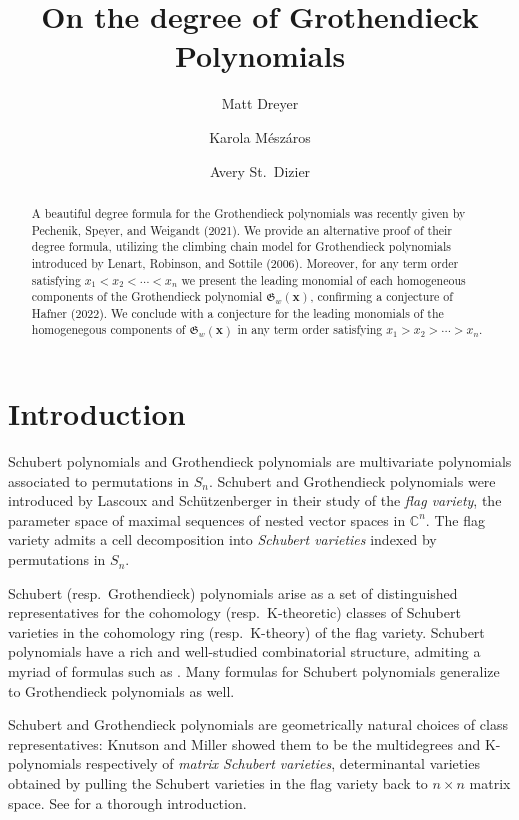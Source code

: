\documentclass[11pt]{amsart}
\title{On the degree of Grothendieck Polynomials}
\author{Matt Dreyer}
\author{Karola M\'esz\'aros}
\author{Avery St.~Dizier}
\theoremstyle{definition}
\theoremstyle{named}
\begin{document}
	\begin{abstract}
		A beautiful degree formula for the Grothendieck polynomials was recently given by Pechenik, Speyer, and Weigandt (2021). We provide an alternative proof of their degree formula, utilizing the climbing chain model for Grothendieck polynomials introduced by Lenart, Robinson, and Sottile (2006). Moreover, for any term order satisfying $x_1<x_2<\cdots<x_n$ we present the leading monomial of each homogeneous components of the Grothendieck polynomial $\mathfrak{G}_w(\bm{x})$, confirming a conjecture of Hafner (2022). We conclude with a conjecture for the leading monomials of the homogenegous components of $\mathfrak{G}_w(\bm{x})$ in any term order satisfying $x_1>x_2>\cdots>x_n$.
	\end{abstract}

	\maketitle
	
	\section{Introduction}
	Schubert polynomials and Grothendieck polynomials are multivariate polynomials associated to permutations in $S_n$. 
	Schubert and Grothendieck polynomials were introduced by Lascoux and Sch\"utzenberger \cite{LS1,LS2} in their study of the \emph{flag variety}, the parameter space of maximal sequences of nested vector spaces in $\mathbb{C}^n$. The flag variety admits a cell decomposition into \emph{Schubert varieties} indexed by permutations in $S_n$.
	
	Schubert (resp.\ Grothendieck) polynomials arise as a set of distinguished representatives for the cohomology (resp.\ K-theoretic) classes of Schubert varieties in the cohomology ring (resp.\ K-theory) of the flag variety. Schubert polynomials have a rich and well-studied combinatorial structure, admiting a myriad of formulas such as \cite{laddermoves, BJS, FKschub, nilcoxeter, thomas, lenart, prismtableaux,balancedtableaux}. Many formulas for Schubert polynomials generalize to Grothendieck polynomials as well. 
	
	Schubert and Grothendieck polynomials are geometrically natural choices of class representatives: Knutson and Miller \cite{grobner} showed them to be the multidegrees and K-polynomials respectively of \emph{matrix Schubert varieties}, determinantal varieties obtained by pulling the Schubert varieties in the flag variety back to $n\times n$ matrix space. See \cite[Chapter 15]{CCA} for a thorough introduction.
	
\end{document}
